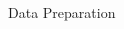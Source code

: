 \message{ !name(presentation.tex)}\documentclass{beamer}
\begin{document}
\begin{frame}{Data Preparation}
\begin{columns}
\begin{column}{.66\textwidth}

    
\end{column}%
\end{columns}
\end{frame}
\end{document}
